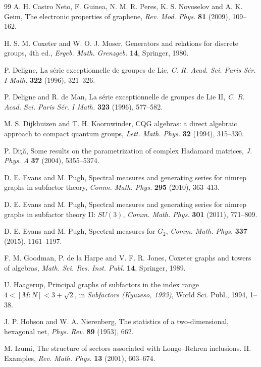 \documentclass[11pt,reqno]{amsart}
\theoremstyle{definition}
\numberwithin{equation}{section}
\begin{document}
\begin{thebibliography}{99}
A. H. Castro Neto, F. Guinea, N. M. R. Peres, K. S. Novoselov and A. K. Geim, The electronic properties of graphene, {\em Rev. Mod. Phys.} {\bf 81} (2009), 109--162.

H. S. M. Coxeter and W. O. J. Moser, Generators and relations for discrete groups, 4th ed., {\em Ergeb. Math. Grenzgeb.} {\bf 14}, Springer, 1980.

P. Deligne, La s\'erie exceptionnelle de groupes de Lie, {\em C. R. Acad. Sci. Paris S\'er. I Math.} {\bf 322} (1996), 321--326.

P. Deligne and R. de Man, La s\'erie exceptionnelle de groupes de Lie II, {\em C. R. Acad. Sci. Paris S\'er. I Math.} {\bf 323} (1996), 577--582.

M. S. Dijkhuizen and T. H. Koornwinder, CQG algebras: a direct algebraic approach to compact quantum groups, {\em Lett. Math. Phys.} {\bf 32} (1994), 315--330.

P. Di\c t\u a, Some results on the parametrization of complex Hadamard matrices, {\em J. Phys. A} {\bf 37} (2004), 5355--5374.

D. E. Evans and M. Pugh, Spectral measures and generating series for nimrep graphs in subfactor theory, {\em Comm. Math. Phys.} {\bf 295} (2010), 363--413.

D. E. Evans and M. Pugh, Spectral measures and generating series for nimrep graphs in subfactor theory II: $SU(3)$, {\em Comm. Math. Phys.} {\bf 301} (2011), 771--809.

D. E. Evans and M. Pugh, Spectral measures for $G_2$, {\em Comm. Math. Phys.} {\bf 337} (2015), 1161--1197.

F. M. Goodman, P. de la Harpe and V. F. R. Jones, Coxeter graphs and towers of algebras, {\em Math. Sci. Res. Inst. Publ.} {\bf 14}, Springer, 1989.

U. Haagerup, Principal graphs of subfactors in the index range $4<[M:N]<3+\sqrt2$, in {\em Subfactors (Kyuzeso, 1993)}, World Sci. Publ., 1994, 1--38.

J. P. Hobson and W. A. Nierenberg, The statistics of a two-dimensional, hexagonal net, {\em Phys. Rev.} {\bf 89} (1953), 662.

M. Izumi, The structure of sectors associated with Longo--Rehren inclusions. II. Examples, {\em Rev. Math. Phys.} {\bf 13} (2001), 603--674.


\end{thebibliography}
\end{document}
